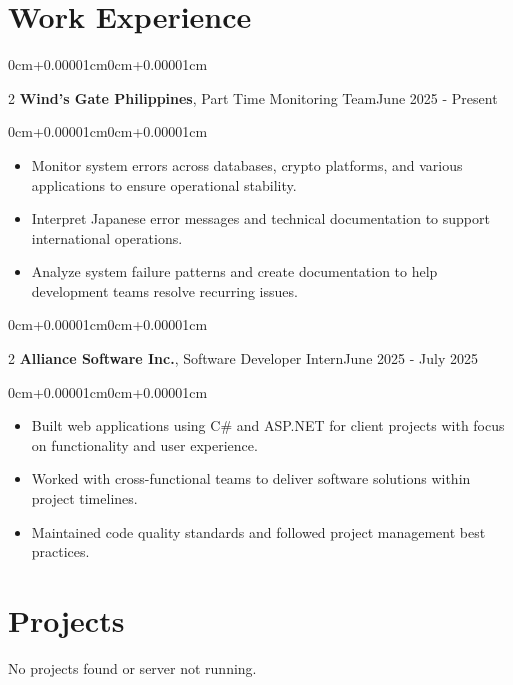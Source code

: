 \documentclass[10pt, letterpaper]{article}
\newenvironment{highlights}{\begin{itemize}[topsep=0.10cm,parsep=0.10cm,partopsep=0pt,itemsep=0pt,leftmargin=0cm+10pt]}{\end{itemize}}
\newenvironment{onecolentry}{\begin{adjustwidth}{0cm+0.00001cm}{0cm+0.00001cm}}{\end{adjustwidth}}
\newenvironment{twocolentry}[2][]{\onecolentry\def\secondColumn{#2}\setcolumnwidth{\fill,5cm}\begin{paracol}{2}}{\switchcolumn \raggedleft \secondColumn\end{paracol}\endonecolentry}
\begin{document}
\section{Work Experience}

    \begin{twocolentry}{June 2025 - Present}
        \textbf{Wind's Gate Philippines}, Part Time Monitoring Team\end{twocolentry}
    \vspace{0.10cm}
    \begin{onecolentry}
        \begin{highlights}
            \item Monitor system errors across databases, crypto platforms, and various applications to ensure operational stability.
            \item Interpret Japanese error messages and technical documentation to support international operations.
            \item Analyze system failure patterns and create documentation to help development teams resolve recurring issues.
        \end{highlights}
    \end{onecolentry}
    \vspace{0.15cm}

    \begin{twocolentry}{June 2025 - July 2025}
        \textbf{Alliance Software Inc.}, Software Developer Intern\end{twocolentry}
    \vspace{0.10cm}
    \begin{onecolentry}
        \begin{highlights}
            \item Built web applications using C\# and ASP.NET for client projects with focus on functionality and user experience.
            \item Worked with cross-functional teams to deliver software solutions within project timelines.
            \item Maintained code quality standards and followed project management best practices.
        \end{highlights}
    \end{onecolentry}
    \vspace{0.15cm}

\section{Projects}
No projects found or server not running.
\end{document}
